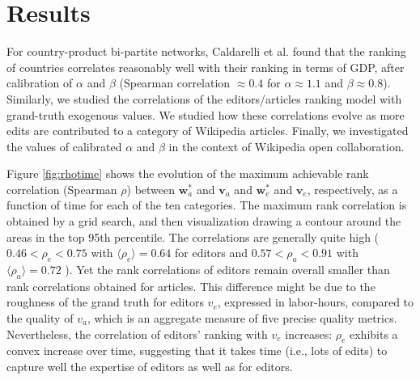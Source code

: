 \section{Results}
For country-product bi-partite networks,  Caldarelli et al. \cite{caldarelli2012network} found that the ranking of countries correlates reasonably well with their ranking in terms of GDP, after calibration of $\alpha$ and $\beta$ (Spearman correlation $\approx 0.4$ for $\alpha \approx 1.1$ and $\beta \approx 0.8$). Similarly, we studied the correlations of the editors/articles ranking model with grand-truth exogenous values. We studied how these correlations evolve as more edits are contributed to a category of Wikipedia articles. Finally, we investigated the values of calibrated $\alpha$ and $\beta$ in the context of Wikipedia open collaboration.

Figure \ref{fig:rhotime} shows the evolution of the maximum achievable rank correlation (Spearman $\rho$) between $\mathbf{w}^*_a$ and $\mathbf{v}_a$ and $\mathbf{w}^*_e$ and $\mathbf{v}_e$, respectively, as a function of time for each of the ten categories.  The maximum rank correlation is obtained by a grid search, and then visualization drawing a contour around the areas in the top 95th percentile.
The correlations are generally quite high ( $ 0.46 < \rho_e < 0.75$ with $\langle \rho_e\rangle = 0.64$ for editors and $0.57 < \rho_a < 0.91$ with $\langle \rho_a\rangle = 0.72$ ). Yet the rank correlations of editors remain overall smaller than rank correlations obtained for articles. This difference might be due to the roughness of the grand truth for editors $v_e$, expressed in labor-hours, compared to the quality of $v_a$, which is an aggregate measure of five precise quality metrics. Nevertheless, the correlation of editors' ranking with $v_e$ increases: $\rho_e$ exhibits a convex increase over time, suggesting that it takes time (i.e., lots of edits) to capture well the expertise of editors as well as for editors. 


